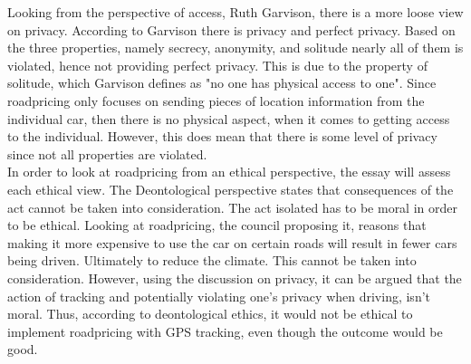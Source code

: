 Looking from the perspective of access, Ruth Garvison, there is a more loose view on privacy. According to Garvison there is privacy and perfect privacy. Based on the three properties, namely secrecy, anonymity, and solitude nearly all of them is violated, hence not providing perfect privacy. This is due to the property of solitude, which Garvison defines as "no one has physical access to one". Since roadpricing only focuses on sending pieces of location information from the individual car, then there is no physical aspect, when it comes to getting access to the individual. However, this does mean that there is some level of privacy since not all properties are violated. \\


\noindent In order to look at roadpricing from an ethical perspective, the essay will assess each ethical view. The Deontological perspective states that consequences of the act cannot be taken into consideration. The act isolated has to be moral in order to be ethical. Looking at roadpricing, the council proposing it, reasons that making it more expensive to use the car on certain roads will result in fewer cars being driven. Ultimately to reduce the climate. This cannot be taken into consideration. However, using the discussion on privacy, it can be argued that the action of tracking and potentially violating one's privacy when driving, isn't moral. Thus, according to deontological ethics, it would not be ethical to implement roadpricing with GPS tracking, even though the outcome would be good.

